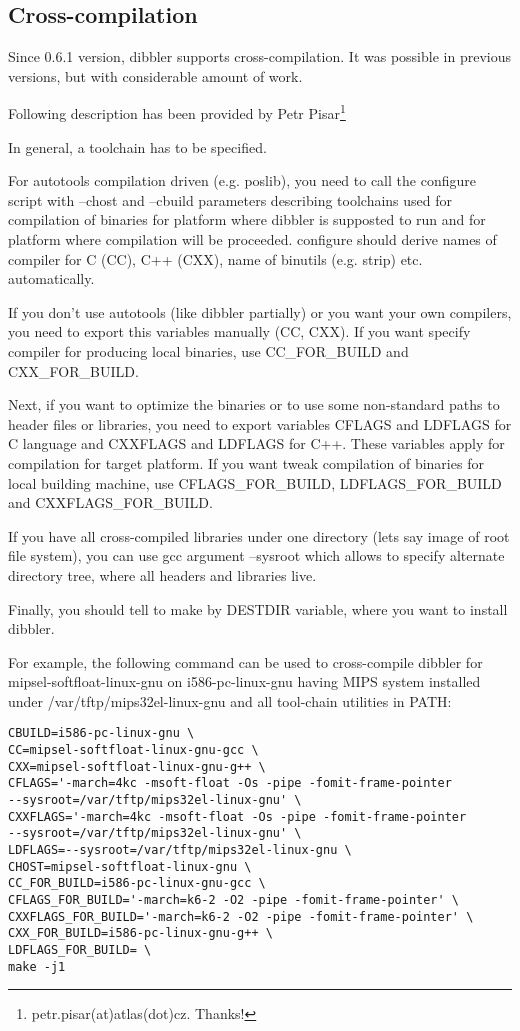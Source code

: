 \subsection{Cross-compilation}
Since 0.6.1 version, dibbler supports cross-compilation. It was
possible in previous versions, but with considerable amount of work.

Following description has been provided by Petr
Pisar\footnote{petr.pisar(at)atlas(dot)cz. Thanks!}

In general, a toolchain has to be specified.

For autotools compilation driven (e.g. poslib), you need to call the
configure script with --chost and --cbuild parameters describing
toolchains used for compilation of binaries for platform where dibbler
is supposted to run and for platform where compilation will be
proceeded. configure should derive names of compiler for C (CC), C++
(CXX), name of binutils (e.g. strip) etc. automatically.

If you don't use autotools (like dibbler partially) or you want your own
compilers, you need to export this variables manually (CC, CXX). If you
want specify compiler for producing local binaries, use CC\_FOR\_BUILD and
CXX\_FOR\_BUILD.

Next, if you want to optimize the binaries or to use some non-standard
paths to header files or libraries, you need to export variables CFLAGS
and LDFLAGS for C language and CXXFLAGS and LDFLAGS for C++. These
variables apply for compilation for target platform. If you want tweak
compilation of binaries for local building machine, use
CFLAGS\_FOR\_BUILD, LDFLAGS\_FOR\_BUILD and CXXFLAGS\_FOR\_BUILD.

If you have all cross-compiled libraries under one directory (lets say
image of root file system), you can use gcc argument --sysroot which
allows to specify alternate directory tree, where all headers and
libraries live.

Finally, you should tell to make by DESTDIR variable, where you want to
install dibbler.

For example, the following command can be used to cross-compile dibbler for
mipsel-softfloat-linux-gnu on i586-pc-linux-gnu having MIPS system
installed under /var/tftp/mips32el-linux-gnu and all tool-chain utilities in PATH:

\begin{lstlisting}
CBUILD=i586-pc-linux-gnu \
CC=mipsel-softfloat-linux-gnu-gcc \
CXX=mipsel-softfloat-linux-gnu-g++ \
CFLAGS='-march=4kc -msoft-float -Os -pipe -fomit-frame-pointer
--sysroot=/var/tftp/mips32el-linux-gnu' \
CXXFLAGS='-march=4kc -msoft-float -Os -pipe -fomit-frame-pointer
--sysroot=/var/tftp/mips32el-linux-gnu' \
LDFLAGS=--sysroot=/var/tftp/mips32el-linux-gnu \
CHOST=mipsel-softfloat-linux-gnu \
CC_FOR_BUILD=i586-pc-linux-gnu-gcc \
CFLAGS_FOR_BUILD='-march=k6-2 -O2 -pipe -fomit-frame-pointer' \
CXXFLAGS_FOR_BUILD='-march=k6-2 -O2 -pipe -fomit-frame-pointer' \
CXX_FOR_BUILD=i586-pc-linux-gnu-g++ \
LDFLAGS_FOR_BUILD= \
make -j1
\end{lstlisting}
